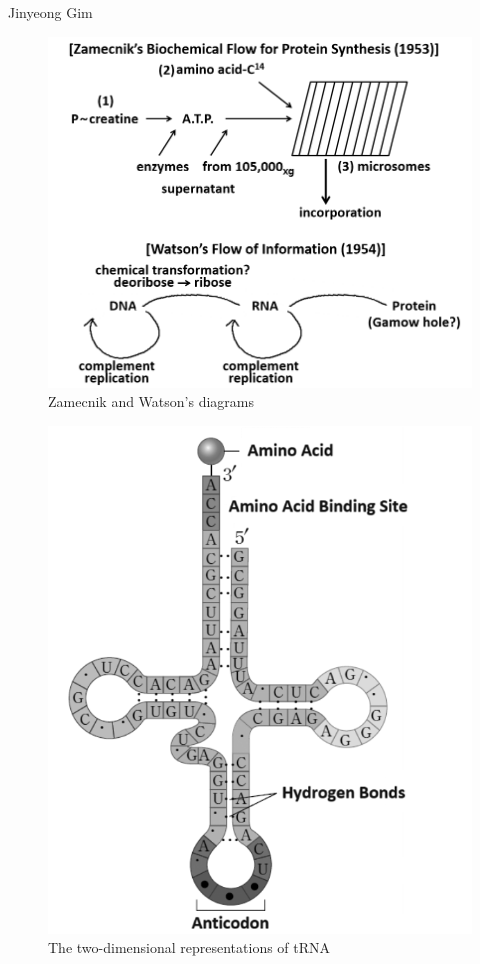 \begin{artengenv}{Jinyeong Gim}
\begin{figure}[H]
 \begin{center}
 \includegraphics[width=.75\textwidth]{ART_Gim/fig.1_zamecnik_watson_bw.png}%
 \end{center}%
 \caption{Zamecnik and Watson's diagrams
 \parencite[based on][p.273]{judson_eighth_2013}}\label{gim.fig1}
\end{figure}

\begin{figure}[H]
 \begin{center}
 \includegraphics[width=.52\textwidth]{ART_Gim/fig.2_tRNA_bw.png}%
 \end{center}%
 \caption{The two-dimensional representations of tRNA
 \parencite[based on][p.1464]{holley_structure_1965}}\label{gim.fig2}
\end{figure}


\end{artengenv}
